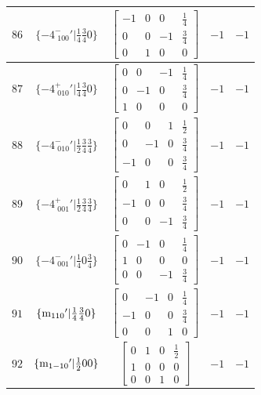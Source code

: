 \documentclass[fleqn,8pt]{jsarticle}
\begin{document}
\begin{longtable}{ccccc}
$ 86 $ & $ \{-4^{-}_{\,\,100}{}'|\frac{1}{4} \frac{3}{4} 0\} $ & $ \begin{bmatrix} -1 & 0 & 0 & \frac{1}{4} \\ 0 & 0 & -1 & \frac{3}{4} \\ 0 & 1 & 0 & 0 \end{bmatrix} $ & $ -1 $ & $ -1 $ \\ \hline
$ 87 $ & $ \{-4^{+}_{\,\,010}{}'|\frac{1}{4} \frac{3}{4} 0\} $ & $ \begin{bmatrix} 0 & 0 & -1 & \frac{1}{4} \\ 0 & -1 & 0 & \frac{3}{4} \\ 1 & 0 & 0 & 0 \end{bmatrix} $ & $ -1 $ & $ -1 $ \\ \hline
$ 88 $ & $ \{-4^{-}_{\,\,010}{}'|\frac{1}{2} \frac{3}{4} \frac{3}{4}\} $ & $ \begin{bmatrix} 0 & 0 & 1 & \frac{1}{2} \\ 0 & -1 & 0 & \frac{3}{4} \\ -1 & 0 & 0 & \frac{3}{4} \end{bmatrix} $ & $ -1 $ & $ -1 $ \\ \hline
$ 89 $ & $ \{-4^{+}_{\,\,001}{}'|\frac{1}{2} \frac{3}{4} \frac{3}{4}\} $ & $ \begin{bmatrix} 0 & 1 & 0 & \frac{1}{2} \\ -1 & 0 & 0 & \frac{3}{4} \\ 0 & 0 & -1 & \frac{3}{4} \end{bmatrix} $ & $ -1 $ & $ -1 $ \\ \hline
$ 90 $ & $ \{-4^{-}_{\,\,001}{}'|\frac{1}{4} 0 \frac{3}{4}\} $ & $ \begin{bmatrix} 0 & -1 & 0 & \frac{1}{4} \\ 1 & 0 & 0 & 0 \\ 0 & 0 & -1 & \frac{3}{4} \end{bmatrix} $ & $ -1 $ & $ -1 $ \\ \hline
$ 91 $ & $ \{{\rm m}_{110}{}'|\frac{1}{4} \frac{3}{4} 0\} $ & $ \begin{bmatrix} 0 & -1 & 0 & \frac{1}{4} \\ -1 & 0 & 0 & \frac{3}{4} \\ 0 & 0 & 1 & 0 \end{bmatrix} $ & $ -1 $ & $ -1 $ \\ \hline
$ 92 $ & $ \{{\rm m}_{1-10}{}'|\frac{1}{2} 0 0\} $ & $ \begin{bmatrix} 0 & 1 & 0 & \frac{1}{2} \\ 1 & 0 & 0 & 0 \\ 0 & 0 & 1 & 0 \end{bmatrix} $ & $ -1 $ & $ -1 $ \\ \hline

\end{longtable}
\end{document}
